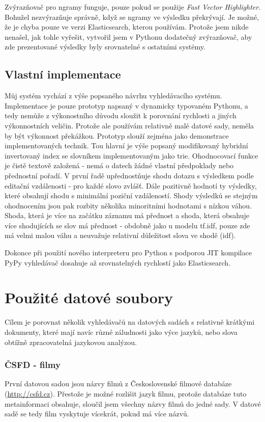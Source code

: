 \documentclass[11pt,letterpaper,oneside,openright]{book}
\begin{document}
Zvýrazňovač pro ngramy funguje, pouze pokud se použije \textit{Fast Vector
Highlighter}. Bohužel nezvýrazňuje správně, když se ngramy ve výsledku
překrývají. Je možné, že je chyba pouze ve verzi Elasticsearch, kterou
používám. Protože jsem nikde nenašel, jak tohle vyřešit, vytvořil jsem v
Pythonu dodatečný zvýrazňovač, aby zde prezentované výsledky byly srovnatelné s
ostatními systémy.

\subsection{Vlastní implementace}
Můj systém vychází z výše popsaného návrhu vyhledávacího systému. Implementace
je pouze prototyp napsaný v dynamicky typovaném Pythonu, a tedy nemůže z
výkonostního důvodu sloužit k porovnání rychlosti a jiných výkonnostních
veličin. Protože ale používám relativně malé datové sady, neměla by být
výkonnost překážkou. Prototyp slouží zejména jako demonstrace implementovaných
technik. Tou hlavní je výše popsaný modifikovaný hybridní invertovaný index se
slovníkem implementovaným jako trie.  Ohodnocovací funkce je čistě textově
založená - nemá o datech žádné vlastní předpoklady nebo přednostní pořadí. V
první řadě upřednostňuje shodu dotazu s výsledkem podle editační vzdálenosti -
pro každé slovo zvlášť. Dále pozitivně hodnotí ty výsledky, které obsahují
shodu s minimální poziční vzdáleností.  Shody výsledků se stejným ohodnocením
jsou pak rozbity několika minoritními hodnotami s nízkou váhou. Shoda, která je
více na začátku záznamu má přednost a shoda, která obsahuje více shodujících se
slov má přednost - obdobně jako u modelu tf.idf, pouze zde má velmi malou váhu
a neuvažuje relativní důležitost slova ve shodě (idf).

Dokonce při použití nového interpreteru pro Python s podporou JIT
kompilace PyPy vyhledávač dosahuje až srovnatelných rychlostí jako
Elasticsearch.


\section{Použité datové soubory}
Cílem je porovnat několik vyhledávačů na datových sadách s relativně krátkými
dokumenty, které mají navíc různé záludnosti jako výce jazyků, nebo slova
obtížně zpracovatelná jazykovou analýzou.

\subsubsection{ČSFD - filmy}
První datovou sadou jsou názvy filmů z Československé filmové databáze
(\url{http://csfd.cz}). Přestože je možné rozlišit jazyk filmu, protože
databáze tuto metainformaci obsahuje, sloučil jsem všechny názvy filmů
do jedné sady. V datové sadě se tedy film vyskytuje vícekrát, pokud má
více názvů.
\end{document}
